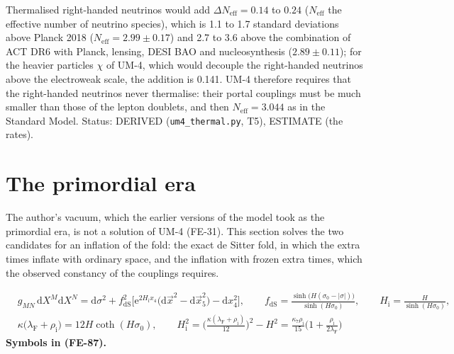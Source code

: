 \documentclass[
  10pt,
]{article}
\begin{document}
Thermalised right-handed neutrinos would add
\(\Delta N_{\mathrm{eff}} = 0.14\) to \(0.24\) (\(N_{\mathrm{eff}}\) the
effective number of neutrino species), which is 1.1 to 1.7 standard
deviations above Planck 2018 (\(N_{\mathrm{eff}} = 2.99 \pm 0.17\)) and
2.7 to 3.6 above the combination of ACT DR6 with Planck, lensing, DESI
BAO and nucleosynthesis (\(2.89 \pm 0.11\)); for the heavier particles
\(\chi\) of UM-4, which would decouple the right-handed neutrinos above
the electroweak scale, the addition is 0.141. UM-4 therefore requires
that the right-handed neutrinos never thermalise: their portal couplings
must be much smaller than those of the lepton doublets, and then
\(N_{\mathrm{eff}} = 3.044\) as in the Standard Model. Status: DERIVED
(\texttt{um4\_thermal.py}, T5), ESTIMATE (the rates).

\hypertarget{the-primordial-era}{%
\section{The primordial era}\label{the-primordial-era}}

The author's vacuum, which the earlier versions of the model took as the
primordial era, is not a solution of UM-4 (FE-31). This section solves
the two candidates for an inflation of the fold: the exact de Sitter
fold, in which the extra times inflate with ordinary space, and the
inflation with frozen extra times, which the observed constancy of the
couplings requires.

\[
\begin{aligned}
&g_{MN}\,\mathrm{d}X^M\mathrm{d}X^N = \mathrm{d}\sigma^2 + f_{\mathrm{dS}}^2\Big[\mathrm{e}^{2H_{\mathrm{i}}x_4}\big(\mathrm{d}\vec x^2 - \mathrm{d}\vec x_5^2\big) - \mathrm{d}x_4^2\Big],\qquad
 f_{\mathrm{dS}} = \frac{\sinh\big(H(\sigma_0 - \lvert\sigma\rvert)\big)}{\sinh(H\sigma_0)},\qquad H_{\mathrm{i}} = \frac{H}{\sinh(H\sigma_0)},\\
&\kappa\big(\lambda_{\mathrm{F}} + \rho_{\mathrm{i}}\big) = 12H\coth(H\sigma_0),\qquad
 H_{\mathrm{i}}^2 = \Big(\frac{\kappa(\lambda_{\mathrm{F}} + \rho_{\mathrm{i}})}{12}\Big)^2 - H^2 = \frac{\kappa_7\rho_{\mathrm{i}}}{15}\Big(1 + \frac{\rho_{\mathrm{i}}}{2\lambda_{\mathrm{F}}}\Big)
\end{aligned} \tag{FE-87}
\] \textbf{Symbols in (FE-87).}
\end{document}
